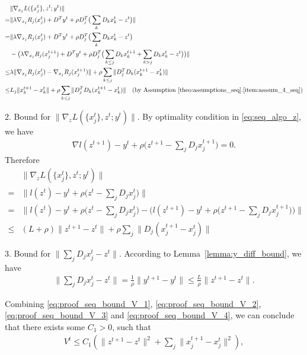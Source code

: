 \begin{align}
    & \|\nabla_{x_j} L(\{x^t_j\}, z^t; y^t)\|\nonumber\\
    = & \|\lambda\nabla_{x_j}R_j(x_j^{t}) + D^Ty^t + \rho D_j^T\big( \sum_{k} D_kx_k^{t} - z^{t}\big)\|\nonumber\\
    = &  \|\lambda\nabla_{x_j}R_j(x_j^{t}) + D^Ty^t + \rho D_j^T\big( \sum_{k} D_kx_k^{t} - z^{t}\big)\nonumber\\
     & - \big(\lambda\nabla_{x_j}R_j(x_j^{t+1}) + D^Ty^t + \rho D_j^T\big(\sum_{k\le j} D_kx_k^{t+1} + \sum_{k>j} D_kx_k^{t} - z^{t}\big)\big)\|\nonumber\\
    \le &  \lambda\|\nabla_{x_j}R_j(x_j^{t}) - \nabla_{x_j}R_j(x_j^{t+1}) \| + \rho\sum_{k\le j}\|D_j^TD_k(x_k^{t+1} - x_k^t)\|\nonumber\\
    \le & L_j\| x_k^{t+1} - x_k^t \|  + \rho\sum_{k\le j}\|D_j^TD_k(x_k^{t+1} - x_k^t)\| \quad\text{(by Assumption~\ref{theo:assumptions_seq}.\ref{item:asssum_4_seq})}\label{eq:proof_seq_bound_V_2}
\end{align}

2. Bound for $\|\nabla_{z} L(\{x^t_j\}, z^t; y^t)\|$. By optimality condition in \eqref{eq:seq_algo_z}, we have
\begin{align}
    \nabla l(z^{t+1}) - y^t + \rho\big(z^{t+1} - \sum_j D_j x_j^{t+1}\big) = 0.\nonumber
\end{align}
Therefore
\begin{align}
        & \|\nabla_{z} L(\{x^t_j\}, z^t; y^t)\|\nonumber\\
        = & \| l(z^{t}) - y^t + \rho\big(z^{t} - \sum_j D_j x_j^{t}\big) \|\nonumber\\
        = & \|l(z^{t}) - y^t + \rho\big(z^{t} - \sum_j D_j x_j^{t}\big) - \big(l(z^{t+1}) - y^t + \rho\big(z^{t+1} - \sum_j D_j x_j^{t+1}\big)\big)\|\nonumber\\
        \le & (L+\rho)\|z^{t+1} - z^{t}\| + \rho\sum_j\|D_j(x_j^{t+1}-x_j^{t})\|\label{eq:proof_seq_bound_V_3}
\end{align}

3. Bound for $\|\sum_j D_jx_j^t - z^t\|$. According to Lemma~\ref{lemma:y_diff_bound}, we have
\begin{align}
     \|\sum_j D_jx_j^t - z^t\| = \frac{1}{\rho}\|y^{t+1}-y^t\| \le \frac{L}{\rho}\|z^{t+1}-z^t\|. \label{eq:proof_seq_bound_V_4}
\end{align}

Combining \eqref{eq:proof_seq_bound_V_1}, \eqref{eq:proof_seq_bound_V_2}, \eqref{eq:proof_seq_bound_V_3} and \eqref{eq:proof_seq_bound_V_4}, we can conclude that there exists some $C_1>0$, such that
\begin{align}
    V^t \le C_1(\|z^{t+1}-z^t\|^2 + \sum_j\|x_j^{t+1}-x_j^t\|^2), \label{eq:proof_seq_bound_V_5}
\end{align}

